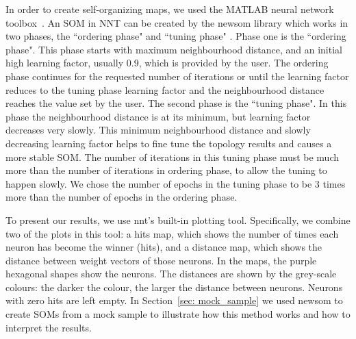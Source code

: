      In order to create self-organizing maps, we used the {\sc MATLAB} neural network toolbox~\citep[NNT,][]{matlabtolbox}.
     An SOM in {\sc NNT} can be created by the {\sc newsom} library which works in two phases, the ``ordering phase" and ``tuning phase" . 
     Phase one is the ``ordering phase". 
     This phase starts with maximum neighbourhood distance, and an initial high learning factor, usually 0.9, which is provided by the user. 
     The ordering phase continues for the requested number of iterations or until the learning factor reduces to the tuning phase learning factor and the neighbourhood distance reaches the value set by the user. %
     The second phase is the ``tuning phase".
     In this phase the neighbourhood distance is at its minimum, but learning factor decreases very slowly.
     This minimum neighbourhood distance and slowly decreasing learning factor helps to fine tune the topology results and causes a more stable SOM. 
     The number of iterations in this tuning phase must be much more than the number of iterations in ordering phase, to allow the tuning to happen slowly. 
     We chose the number of epochs in the tuning phase to be 3 times more than the number of epochs in the ordering phase.
     
     To present our results, we use {\sc nnt}'s built-in plotting tool.
     Specifically, we combine two of the plots in this tool: a hits map, which shows the number of times each neuron has become the winner (hits), and a distance map, which shows the distance between weight vectors of those neurons.
     In the maps, the purple hexagonal shapes show the neurons. 
     The distances are shown by the grey-scale colours: the darker the colour, the larger the distance between neurons.
     Neurons with zero hits are left empty.
     In Section~\ref{sec: mock_sample} we used {\sc newsom} to create SOMs from a mock sample to illustrate how this method works and how to interpret the results.

